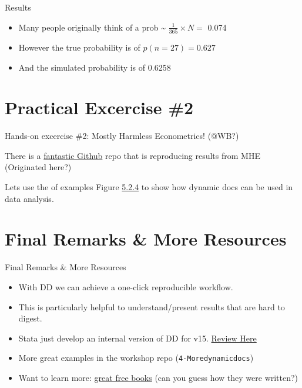 \begin{frame}{Results}

\begin{itemize}
\tightlist
\item
  Many people originally think of a prob \textasciitilde{}
  \(\frac{1}{365} \times N =\) 0.074
\item
  However the true probability is of \(p(n= 27) = 0.627\)
\item
  And the simulated probability is of 0.6258
\end{itemize}

\end{frame}

\section{Practical Excercise \#2}\label{practical-excercise-2}

\begin{frame}{Hands-on excercise \#2: Mostly Harmless Econometrics!
(@WB?)}

There is a
\href{https://github.com/vikjam/mostly-harmless-replication}{fantastic
Github} repo that is reproducing results from MHE (Originated here?)

Lets use the of examples Figure
\href{https://github.com/vikjam/mostly-harmless-replication/blob/master/05\%20Fixed\%20Effects\%2C\%20DD\%20and\%20Panel\%20Data/Figure\%205-2-4.r}{5.2.4}
to show how dynamic docs can be used in data analysis.

\end{frame}

\section{Final Remarks \& More
Resources}\label{final-remarks-more-resources}

\begin{frame}[fragile]{Final Remarks \& More Resources}

\begin{itemize}
\tightlist
\item
  With DD we can achieve a one-click reproducible workflow.
\item
  This is particularly helpful to understand/present results that are
  hard to digest.
\item
  Stata just develop an internal version of DD for v15.
  \href{https://www.bitss.org/2017/09/05/review-of-statas-dyndoc/}{Review
  Here}
\item
  More great examples in the workshop repo (\texttt{4-Moredynamicdocs})
\item
  Want to learn more: \href{https://bookdown.org/}{great free books}
  (can you guess how they were written?)
\end{itemize}

\end{frame}
